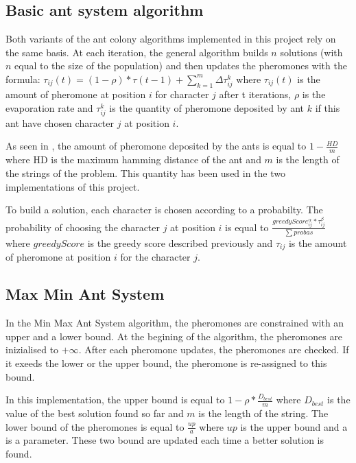 \documentclass{article}
\begin{document}
\subsection{Basic ant system algorithm}

Both variants of the ant colony algorithms implemented in this project rely on the same basis.
At each iteration, the general algorithm builds $n$ solutions (with $n$ equal to the size of the population) and then updates the pheromones with the formula: $\tau_{ij}(t) = (1-\rho)*\tau(t-1) + \sum \limits_{k=1}^m \Delta \tau_{ij}^k$  where $\tau_{ij}(t)$ is the amount of pheromone at position $i$ for character $j$ after t iterations, $\rho$ is the evaporation rate and $\tau_{ij}^k$ is the quantity of pheromone deposited by ant $k$ if this ant have chosen character $j$ at position $i$. \newline

As seen in \cite{aco_csp}, the amount of pheromone deposited by the ants is equal to $1-\frac{HD}{m}$ where HD is the maximum hamming distance of the ant and $m$ is the length of the strings of the problem.
This quantity has been used in the two implementations of this project. \newline

To build a solution, each character is chosen according to a probabilty.
The probability of choosing the character $j$ at position $i$ is equal to $ \frac{greedyScore_{ij}^{\alpha} * \tau_{ij}^{\beta}}{\sum probas}$ where $greedyScore$ is the greedy score described previously and $\tau_{ij}$ is the amount of pheromone at position $i$ for the character $j$.


\subsection{Max Min Ant System}

In the Min Max Ant System algorithm, the pheromones are constrained with an upper and a lower bound.
At the begining of the algorithm, the pheromones are inizialised to $+\infty$.
After each pheromone updates, the pheromones are checked.
If it exeeds the lower or the upper bound, the pheromone is re-assigned to this bound. \newline

In this implementation, the upper bound is equal to $1-\rho*\frac{D_{best}}{m}$ where $D_{best}$ is the value of the best solution found so far and $m$ is the length of the string.
The lower bound of the pheromones is equal to $\frac{up}{a}$ where $up$ is the upper bound and a is a parameter.
These two bound are updated each time a better solution is found.\newline
\end{document}
